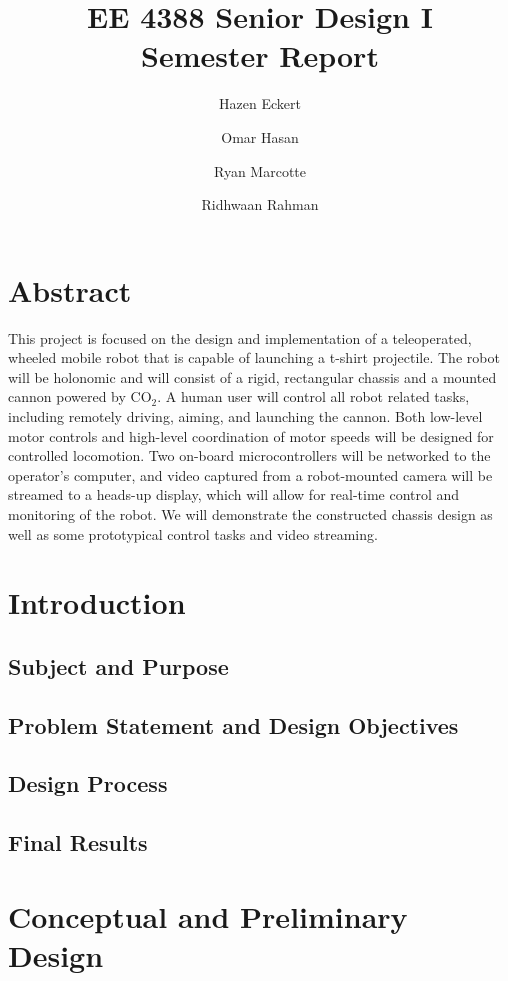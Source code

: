 \documentclass[letterpaper,12pt]{article}
\begin{document}
\title{EE 4388 Senior Design I\\Semester Report}
\author{Hazen Eckert \and Omar Hasan \and Ryan Marcotte \and Ridhwaan Rahman}
\maketitle
\tableofcontents
\newpage

\section{Abstract}
\noindent This project is focused on the design and implementation of a teleoperated, wheeled mobile robot that is capable of launching a t-shirt projectile. The robot will be holonomic and will consist of a rigid, rectangular chassis and a mounted cannon powered by $\textrm{CO}_2$. A human user will control all robot related tasks, including remotely driving, aiming, and launching the cannon. Both low-level motor controls and high-level coordination of motor speeds will be designed for controlled locomotion. Two on-board microcontrollers will be networked to the operator's computer, and video captured from a robot-mounted camera will be streamed to a heads-up display, which will allow for real-time control and monitoring of the robot. We will demonstrate the constructed chassis design as well as some prototypical control tasks and video streaming.

\section{Introduction}
\subsection{Subject and Purpose}
\subsection{Problem Statement and Design Objectives}
\subsection{Design Process}
\subsection{Final Results}

\section{Conceptual and Preliminary Design}
\end{document}

